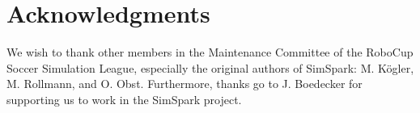 \documentclass{llncs}
\begin{document}
\section*{Acknowledgments}
We wish to thank other members in the Maintenance Committee of the RoboCup Soccer Simulation League, especially the original authors of SimSpark: M. K\"ogler, M. Rollmann, and O. Obst. Furthermore, thanks go to J. Boedecker for supporting us to work in the SimSpark project.


\end{document}
